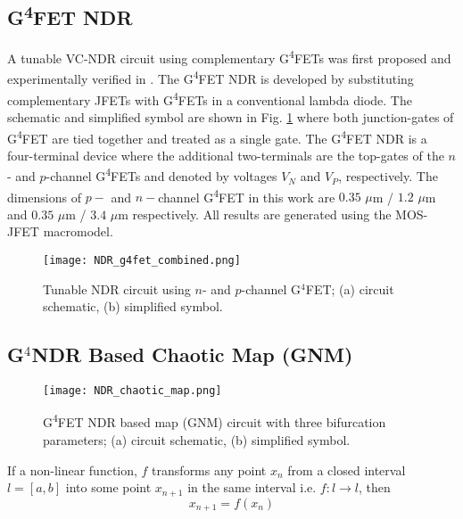 \documentclass[conference]{IEEEtran}
\begin{document}
\subsection{G\textsuperscript4FET NDR}
 A tunable VC-NDR circuit using complementary G\textsuperscript4FETs was first proposed and experimentally verified in \cite{akarvardar2006four}. The G\textsuperscript4FET NDR is developed by substituting complementary JFETs with G\textsuperscript4FETs in a conventional lambda diode\cite{takagi1975complementary}. The schematic and simplified symbol are shown in Fig. \ref{fig:G4NDR}  where both junction-gates of G\textsuperscript4FET are tied together and treated as a single gate. The G\textsuperscript4FET NDR is a four-terminal device where the additional two-terminals are the top-gates of the $n$- and $p$-channel G\textsuperscript4FETs and denoted by voltages $V_N$ and $V_P$, respectively. The dimensions of $p-$ and $n-$channel G\textsuperscript4FET in this work are $0.35$ $\mu$m / $1.2$ $\mu$m and  $0.35$ $\mu$m / $3.4$ $\mu$m respectively. All results are generated using the MOS-JFET macromodel\cite{hasan2018macromodel}.
 \begin{figure}
   \centering
   \texttt{[image: NDR\_g4fet\_combined.png]}
   \setlength\belowcaptionskip{-15.0pt}
    \caption{\small{Tunable NDR circuit using $n$- and $p$-channel G$^4$FET; (a) circuit schematic, (b) simplified symbol.} }
    \label{fig:G4NDR}
\end{figure}

\subsection{G$^4$NDR Based Chaotic Map (GNM)}
\begin{figure}
\centering
\texttt{[image: NDR\_chaotic\_map.png]}
\caption{\small{G\textsuperscript4FET NDR based map (GNM) circuit with three bifurcation parameters; (a) circuit schematic, (b) simplified symbol.} }
\label{map}
\end{figure}
If a non-linear function, $f$ transforms any point $x_n$ from a closed interval $l=[a,b]$ into some point $x_{n+1}$ in the same interval i.e. $f:l\rightarrow l$, then %
\begin{equation}
    x_{n+1}=f(x_n)
    \label{eq_disc_map}
\end{equation}
\end{document}
